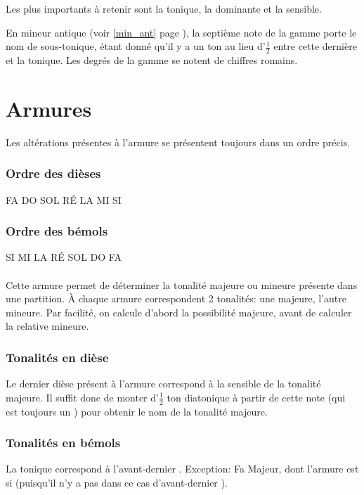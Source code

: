 Les plus importants à retenir sont la tonique, la dominante et la sensible.

En mineur antique (voir \ref{min_ant} page \pageref{min_ant}), la septième note de la gamme porte le nom de sous-tonique, étant donné qu'il y a un ton au lieu d'$\frac1 2$ entre cette dernière et la tonique. Les degrés de la gamme se notent de chiffres romains.

\section{Armures}
Les altérations présentes à l'armure se présentent toujours dans un ordre précis.
\subsubsection{Ordre des dièses}
FA DO SOL RÉ LA MI SI
\subsubsection{Ordre des bémols}
SI MI LA RÉ SOL DO FA
\\
\\
Cette armure permet de déterminer la tonalité majeure ou mineure présente dans une partition. À chaque armure correspondent 2 tonalités: une majeure, l'autre mineure. Par facilité, on calcule d'abord la possibilité majeure, avant de calculer la relative mineure.

\subsubsection{Tonalités en dièse}
Le dernier dièse présent à l'armure correspond à la sensible de la tonalité majeure. Il suffit donc de monter d'$\frac1 2$ ton diatonique à partir de cette note (qui est toujours un \sharp) pour obtenir le nom de la tonalité majeure.
\subsubsection{Tonalités en bémols}
La tonique correspond à l'avant-dernier \flat. Exception: Fa Majeur, dont l'armure est si \flat{} (puisqu'il n'y a pas dans ce cas d'avant-dernier \flat).

